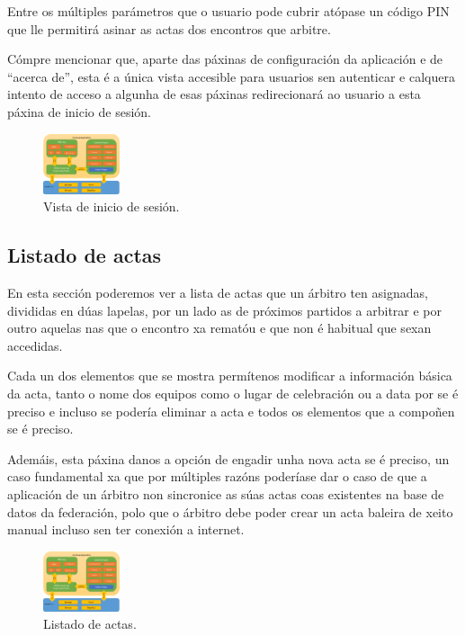     Entre os múltiples parámetros que o usuario pode cubrir atópase un código 
PIN que lle permitirá asinar as actas dos encontros que arbitre.

    Cómpre mencionar que, aparte das páxinas de configuración da aplicación e 
de ``acerca de'', esta é a única vista accesible para usuarios sen autenticar e 
calquera intento de acceso a algunha de esas páxinas redirecionará ao usuario a 
esta páxina de inicio de sesión.

      \begin{figure}[h!]
        \begin{center}
        \includegraphics[width=0.2\textwidth]{./img/cordova_arquitectura.png}
        \caption{Vista de inicio de sesión.}
        \end{center}
      \end{figure}

    \subsection{Listado de actas}
    En esta sección poderemos ver a lista de actas que un árbitro ten 
asignadas, divididas en dúas lapelas, por un lado as de próximos partidos a 
arbitrar e por outro aquelas nas que o encontro xa rematóu e que non é habitual 
que sexan accedidas.

    Cada un dos elementos que se mostra permítenos modificar a información 
básica da acta, tanto o nome dos equipos como o lugar de celebración ou a data 
por se é preciso e incluso se podería eliminar a acta e todos os elementos 
que a compoñen se é preciso.

    Ademáis, esta páxina danos a opción de engadir unha nova acta se é preciso, 
un caso fundamental xa que por múltiples razóns poderíase dar o caso de que a 
aplicación de un árbitro non sincronice as súas actas coas existentes na base 
de datos da federación, polo que o árbitro debe poder crear un acta baleira de 
xeito manual incluso sen ter conexión a internet.

      \begin{figure}[h!]
        \begin{center}
        \includegraphics[width=0.2\textwidth]{./img/cordova_arquitectura.png}
        \caption{Listado de actas.}
        \end{center}
      \end{figure}

